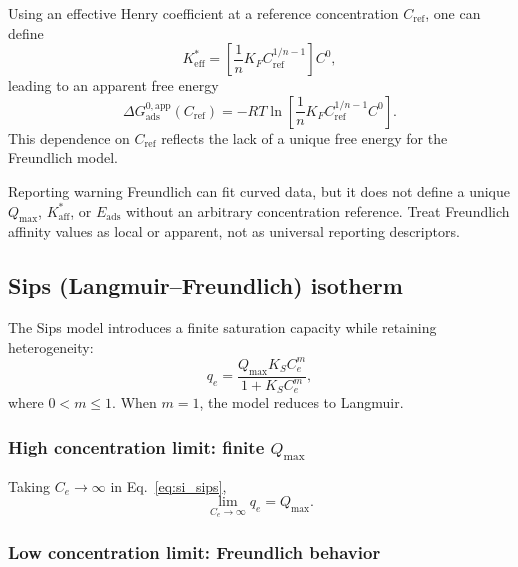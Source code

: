 \documentclass[journal=jacsat,manuscript=article]{achemso}
\begin{document}
Using an effective Henry coefficient at a reference concentration
\(C_{\mathrm{ref}}\), one can define
\begin{equation}
	K_{\mathrm{eff}}^{\ast}
	= \left[\frac{1}{n} K_F C_{\mathrm{ref}}^{1/n - 1}\right] C^0,
\end{equation}
leading to an apparent free energy
\begin{equation}
	\Delta G_{\mathrm{ads}}^{0,\mathrm{app}}(C_{\mathrm{ref}})
	= - R T \ln\!\left[
	\frac{1}{n} K_F C_{\mathrm{ref}}^{1/n - 1} C^0 \right].
\end{equation}
This dependence on \(C_{\mathrm{ref}}\) reflects the lack of a unique
free energy for the Freundlich model.

\begin{redbox}{Reporting warning}
	Freundlich can fit curved data, but it does not define a unique
	\(Q_{\max}\), \(K_{\mathrm{aff}}^{\ast}\), or \(E_{\mathrm{ads}}\)
	without an arbitrary concentration reference. Treat Freundlich
	affinity values as local or apparent, not as universal reporting descriptors.
\end{redbox}

\subsection{Sips (Langmuir--Freundlich) isotherm}
\label{sec:si_sips}

The Sips model introduces a finite saturation capacity while retaining
heterogeneity:
\begin{equation}
	q_e = \frac{Q_{\max} K_S C_e^{m}}{1 + K_S C_e^{m}},
	\label{eq:si_sips}
\end{equation}
where \(0 < m \leq 1\). When \(m = 1\), the model reduces to Langmuir.

\subsubsection{High concentration limit: finite \(Q_{\max}\)}

Taking \(C_e \to \infty\) in Eq.~\eqref{eq:si_sips},
\begin{equation}
	\lim_{C_e \to \infty} q_e = Q_{\max}.
\end{equation}

\subsubsection{Low concentration limit: Freundlich behavior}
\end{document}
